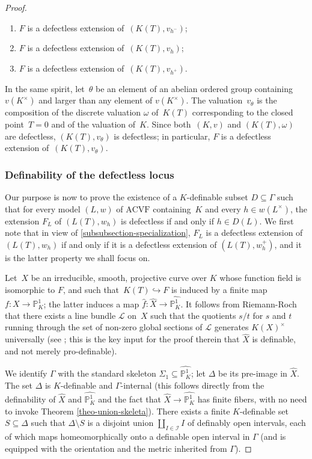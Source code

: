 \documentclass[JEP,XML,SOM,Unicode,ThmDefs,NoEqCountersInSection,published]{cedram}
\newenvironment{enumeratei}
{\bgroup\def\theenumi{\roman{enumi}}\def\theenumii{\arabic{enumii}}\begin{enumerate}}
{\end{enumerate}\egroup}
\newcommand{\acvf}{\mathrm{ACVF}}
\renewcommand{\P}{\mathbb P}
\let\subset\subseteq
\theoremstyle{plain}
\theoremstyle{definition}
\begin{document}
\begin{proof}
\begin{enumeratei}
\item $F$ is a defectless extension of~$(K(T), v_{h^-})$;

\item $F$ is a defectless extension of~$(K(T),v_h)$;

\item $F$ is a defectless extension of~$(K(T),v_{h^+})$.
\end{enumeratei}

In the same spirit, let~$\theta$ be
an element of an
abelian ordered group containing~$v(K^\times)$ and larger than any element of
$v(K^\times)$. The valuation~$v_\theta$ is the composition of the discrete valuation $\omega$ of~$K(T)$ corresponding to the closed point~$T=0$ and of the valuation of~$K$. Since both~$(K,v)$ and
$(K(T),\omega)$ are defectless, $(K(T), v_\theta)$ is defectless; in particular, $F$ is a defectless extension of~$(K(T),v_\theta)$.

\subsubsection{Definability of the defectless locus}
\label{defectless-definable}
Our purpose is now to prove the existence of a
$K$-definable subset $D\subset \Gamma$ such that for
every model $(L,w)$ of $\acvf$ containing~$K$ and every $h\in
w(L^\times)$, the extension $F_L$ of $(L(T),w_h)$ is
defectless if and only if $h\in D(L)$. We first note that in view
of
\ref{subsubsection-specialization}, $F_L$ is a defectless
extension of $(L(T),w_h)$ if and only if it is a defectless
extension of $(L(T), w_h^{+})$, and it is the latter property we shall
focus on.

Let~$X$ be an irreducible, smooth, projective curve over
$K$ whose function field is isomorphic to $F$, and such that~$K(T)\hookrightarrow F$ is induced by a finite map~$f\colon X\to \P^1_K$; the latter induces
a map $\widehat f\colon \widehat X\to \widehat{\P^1_K}$.
It
follows from Riemann-Roch that there exists a line bundle $\mathscr L$ on~$X$ such
that the quotients $s/t$ for $s$ and $t$ running through
the set of non-zero global sections
of $\mathscr L$ generates $K(X)^\times$ universally
(see \cite[7.1]{HL}; this is the key input for the proof therein that $\widehat X$
is definable, and not merely pro-definable).

We identify $\Gamma$ with the standard skeleton $\Sigma_1
\subset \widehat{\P^1_K}$; let $\Delta$ be its pre-image in
$\widehat X$. The set $\Delta$ is $K$-definable and $\Gamma$-internal
(this follows directly from the definability of $\widehat X$ and $\widehat{\P^1_K}$
and the fact that $\widehat X\to \widehat{\P^1_K}$ has finite fibers,
with no need to invoke Theorem \ref{theo-union-skeleta}).
There exists a finite $K$-definable set $S\subset \Delta$ such that
$\Delta\setminus S$ is a disjoint union $\coprod
_{I\in \mathscr I} I$ of definably open intervals, each of which maps
homeomorphically onto a definable open interval in
$\Gamma$ (and is equipped with the orientation and the metric
inherited from
$\Gamma$).


\end{proof}
\end{document}
